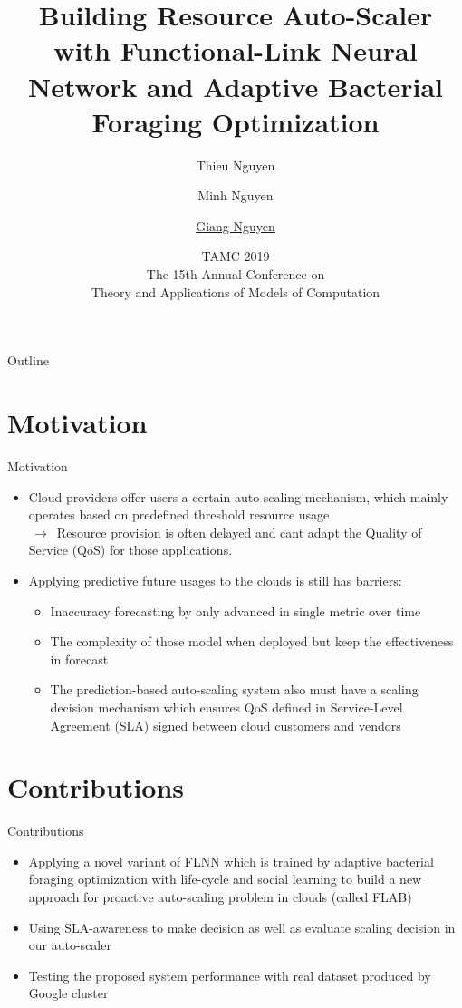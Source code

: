 \documentclass{beamer}
\title{\large Building Resource Auto-Scaler with Functional-Link Neural Network and Adaptive Bacterial Foraging Optimization}
\author{\small Thieu Nguyen \and Minh Nguyen \and \underline{Giang Nguyen}}
\institute{ 
Hanoi University of Science and Technology, Hanoi, Vietnam\\
Institute of Informatics, Slovak Academy of Sciences, Bratislava, Slovakia}
\date{TAMC 2019\\
The 15th Annual Conference on \\Theory and Applications of Models of Computation }
\begin{document}
\begin{frame}
  \titlepage
\end{frame}

\begin{frame}{Outline}
  \tableofcontents
\end{frame}


\section{Motivation}
\begin{frame}{Motivation}
	\begin{itemize}
		\item {Cloud providers offer users a certain auto-scaling mechanism, which mainly operates based on predefined threshold resource usage\\ $\,\to\,$ Resource provision is often delayed and cant adapt the Quality of Service (QoS) for those applications. }
		\item {Applying predictive future usages to the clouds is still has barriers:} 
		\begin{itemize}
			\item Inaccuracy forecasting by only advanced in single metric over time
			\item The complexity of those model when deployed but keep the effectiveness in forecast 
			\item The prediction-based auto-scaling system also must have a scaling decision mechanism which ensures QoS defined in Service-Level Agreement (SLA) signed between cloud customers and vendors
		\end{itemize}
	\end{itemize}
\end{frame}

\section{Contributions}
\begin{frame}{Contributions}
	\begin{itemize}
		\item {Applying a novel variant of FLNN which is trained by adaptive bacterial foraging optimization with life-cycle and social learning  to build a new approach for proactive auto-scaling problem in clouds (called FLAB)}
		\item {Using SLA-awareness to make decision as well as evaluate scaling decision in our auto-scaler }
		\item {Testing the proposed system performance with real dataset produced by Google cluster}
	\end{itemize}
\end{frame}
\end{document}
